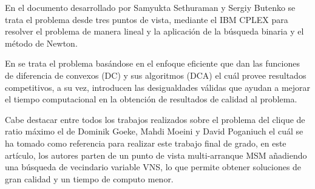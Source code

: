 En el documento desarrollado por Samyukta Sethuraman  y Sergiy Butenko \cite{mrcp-Sethuraman:2015} se trata el problema desde tres puntos de vista, mediante el IBM CPLEX para resolver el problema de manera lineal y la aplicación de la búsqueda binaria y el método de Newton.

En \cite{mrcp-moeni} se trata el problema basándose en el enfoque eficiente que dan las funciones de diferencia de convexos (DC) y sus algoritmos (DCA) el cuál provee resultados competitivos, a su vez, introducen las desigualdades válidas que ayudan a mejorar el tiempo computacional en la obtención de resultados de calidad al problema.

Cabe destacar entre todos los trabajos realizados sobre el problema del clique de ratio máximo el de Dominik Goeke, Mahdi Moeini y David Poganiuch \cite{mrcp-GOEKE2017283} el cuál se ha tomado como referencia para realizar este trabajo final de grado, en este artículo, los autores parten de un punto de vista multi-arranque \gls{MSM} añadiendo una búsqueda de vecindario variable \gls{VNS}, lo que permite obtener soluciones de gran calidad y un tiempo de computo menor.



